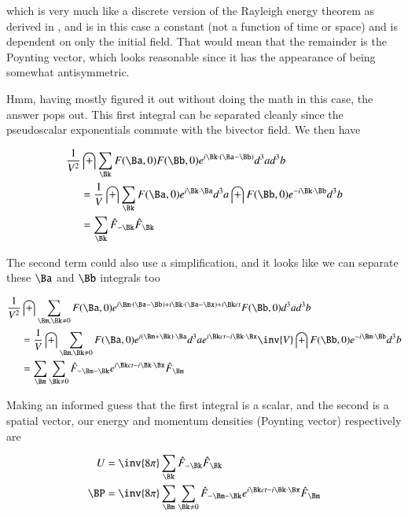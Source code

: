 \documentclass{article}
\begin{document}
which is very much like a discrete version of the Rayleigh energy theorem as derived in \cite{PJqmFourier}, and is in this case
a constant (not a function of time or space) and is dependent on only the initial field.
That would mean that the remainder is the Poynting vector,
which looks reasonable since it has the appearance of being somewhat antisymmetric.

Hmm, having mostly figured it out without doing the math in this case, the answer pops out.  This first integral can be separated cleanly since the pseudoscalar
exponentials commute with the bivector field.  We then have

\begin{align*}
\frac{1}{V^2} &\int \sum_{\Bk} F(\Ba, 0) F(\Bb, 0) e^{ i \Bk \cdot (\Ba - \Bb) } d^3 a d^3 b \\
&= \frac{1}{V} \int \sum_{\Bk} F(\Ba, 0) e^{ i \Bk \cdot \Ba } d^3 a \int F(\Bb, 0) e^{ -i \Bk \cdot \Bb } d^3 b \\
&= \sum_{\Bk} \hat{F}_{-\Bk} \hat{F}_{\Bk} \\
\end{align*}


The second term could also use a simplification, and it looks like we can separate these $\Ba$ and $\Bb$ integrals too

\begin{align*}
\frac{1}{V^2} &\int \sum_{\Bm, \Bk \ne 0} F(\Ba, 0) e^{ 
i \Bm \cdot (\Ba -\Bb) 
+i \Bk \cdot (\Ba -\Bx)
+ i \Bk ct 
} F(\Bb, 0) d^3 a d^3 b \\
&=\frac{1}{V} \int \sum_{\Bm, \Bk \ne 0} F(\Ba, 0) e^{ i (\Bm + \Bk) \cdot \Ba } d^3 a
e^{ i \Bk ct -i \Bk \cdot \Bx }
\inv{V} \int F(\Bb, 0) 
e^{-i \Bm \cdot \Bb}
d^3 b
 \\
&= \sum_{\Bm} \sum_{\Bk \ne 0} \hat{F}_{-\Bm -\Bk} e^{ i \Bk ct -i \Bk \cdot \Bx } \hat{F}_{\Bm} \\
\end{align*}

Making an informed guess that the first integral is a scalar, and the second is a spatial vector, our energy and momentum densities (Poynting vector) respectively are

\begin{align}\label{eqn:energyMomentum}
U &= \inv{8 \pi} \sum_{\Bk} \hat{F}_{-\Bk} \hat{F}_{\Bk} \\
\BP &= \inv{8 \pi} \sum_{\Bm} \sum_{\Bk \ne 0} \hat{F}_{-\Bm -\Bk} e^{ i \Bk ct -i \Bk \cdot \Bx } \hat{F}_{\Bm}
\end{align}
\end{document}
